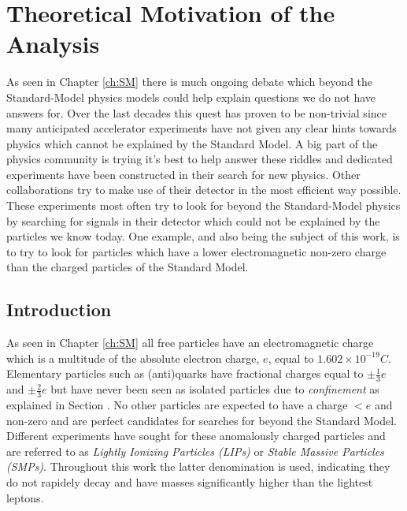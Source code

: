 
\chapter{Theoretical Motivation of the Analysis}
As seen in Chapter \ref{ch:SM} there is much ongoing debate which beyond the Standard-Model physics models could help explain questions we do not have answers for. Over the last decades this quest has proven to be non-trivial since many anticipated accelerator experiments have not given any clear hints towards physics which cannot be explained by the Standard Model. A big part of the physics community is trying it's best to help answer these riddles and dedicated experiments have been constructed in their search for new physics. Other collaborations try to make use of their detector in the most efficient way possible. These experiments most often try to look for beyond the Standard-Model physics by searching for signals in their detector which could not be explained by the particles we know today. One example, and also being the subject of this work, is to try to look for particles which have a lower electromagnetic non-zero charge than the charged particles of the Standard Model.

\section{Introduction}
As seen in Chapter \ref{ch:SM} all free particles have an electromagnetic charge which is a multitude of the absolute electron charge, $e$, equal to $1.602 \times 10^{-19} C$. Elementary particles such as (anti)quarks have fractional charges equal to $\pm\frac{1}{3}e$ and $\pm\frac{2}{3}e$ but have never been seen as isolated particles due to \textit{confinement} as explained in Section \cite{sub:quarks}. No other particles are expected to have a charge $<e$ and non-zero and are perfect candidates for searches for beyond the Standard Model. Different experiments have sought for these anomalously charged particles and are referred to as \textit{Lightly Ionizing Particles (LIPs)} or \textit{Stable Massive Particles (SMPs)}. Throughout this work the latter denomination is used, indicating they do not rapidely decay and have masses significantly higher than the lightest leptons.

